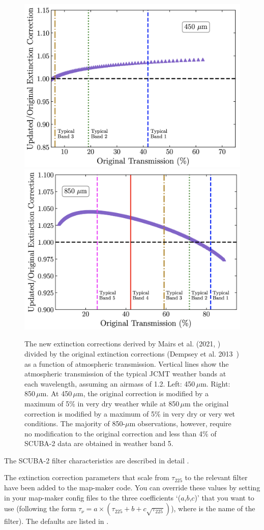 \begin{figure}
\begin{center}
\includegraphics[width=0.4\linewidth]{sc21-NewExtCor-450} \hspace{0.02\linewidth}
\includegraphics[width=0.4\linewidth]{sc21-NewExtCor-850}
\caption[Updated Extinction Corrections]{The new extinction corrections
derived by Mairs et al. (2021, \cite{mairs21}) divided by the original extinction corrections (Dempsey et al. 2013~\cite{dempsey12})
as a function of atmospheric transmission. Vertical lines show the atmospheric transmission of the typical JCMT
weather bands at each wavelength, assuming an airmass of 1.2. Left: 450\,$\mu$m. Right: 850\,$\mu$m. At 450\,$\mu$m,
the original correction is modified by a maximum of 5\% in very dry weather while at 850\,$\mu$m the original correction is
modified by a maximum of 5\% in very dry or very wet conditions. The majority of 850-$\mu$m observations, however, require no modification
to the original correction and less than 4\% of SCUBA-2 data are obtained in weather band 5. \label{fig:NewExtCor}}
\end{center}
\end{figure}


The SCUBA-2 filter characteristics are described in detail
.

The extinction correction parameters that scale from $\tau_{225}$ to
the relevant filter have been added to the map-maker code. You can
override these values by setting  in
your map-maker config files to the three coefficients `($a$,$b$,$c$)' that
you want to use (following the form $\tau_{\nu} = a \times (\tau_{225} + b + c\sqrt{\tau_{225}})$), where  is the name of the
filter). The defaults are listed in
.



